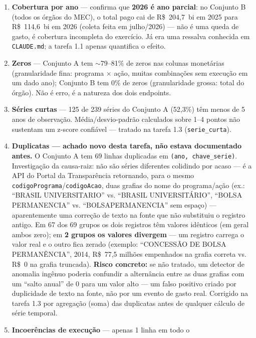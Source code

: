 \documentclass[11pt,a4paper]{article}
\begin{document}
\begin{enumerate}
    \item \textbf{Cobertura por ano} --- confirma que \textbf{2026 é ano
    parcial}: no Conjunto B (todos os órgãos do MEC), o total pago cai de
    R\$~204,7~bi em 2025 para R\$~114,6~bi em 2026 (coleta feita em
    julho/2026) --- não é uma queda de gasto, é cobertura incompleta do
    exercício. Já era uma ressalva conhecida em \texttt{CLAUDE.md}; a
    tarefa 1.1 apenas quantifica o efeito.
    \item \textbf{Zeros} --- Conjunto A tem ${\sim}$79--81\% de zeros nas
    colunas monetárias (granularidade fina: programa $\times$ ação, muitas
    combinações sem execução em um dado ano); Conjunto B tem 0\% de zeros
    (granularidade grossa: total do órgão). Não é erro, é a natureza dos
    dois endpoints.
    \item \textbf{Séries curtas} --- 125 de 239 séries do Conjunto A
    (52,3\%) têm menos de 5 anos de observação. Média/desvio-padrão
    calculados sobre 1--4 pontos não sustentam um z-score confiável ---
    tratado na tarefa 1.3 (\texttt{serie\_curta}).
    \item \textbf{Duplicatas --- achado novo desta tarefa, não estava
    documentado antes.} O Conjunto A tem 69 linhas duplicadas em
    \texttt{(ano, chave\_serie)}. Investigação da causa-raiz: não são
    séries diferentes colidindo por acaso --- é a API do Portal da
    Transparência retornando, para o mesmo
    \texttt{codigoPrograma}/\texttt{codigoAcao}, duas grafias do nome do
    programa/ação (ex.: ``BRASIL UNIVERSITARIO'' vs. ``BRASIL
    UNIVERSITÁRIO'', ``BOLSA PERMANENCIA'' vs. ``BOLSAPERMANENCIA'' sem
    espaço) --- aparentemente uma correção de texto na fonte que não
    substituiu o registro antigo. Em 67 dos 69 grupos os dois registros têm
    valores idênticos (em geral ambos zero); em \textbf{2 grupos os valores
    divergem} --- um registro carrega o valor real e o outro fica zerado
    (exemplo: ``CONCESSÃO DE BOLSA PERMANÊNCIA'', 2014, R\$~77,5 milhões
    empenhados na grafia correta vs. R\$~0 na grafia truncada).
    \textbf{Risco concreto:} se não tratado, um detector de anomalia
    ingênuo poderia confundir a alternância entre as duas grafias com um
    ``salto anual'' de 0 para um valor alto --- um falso positivo criado
    por duplicidade de texto na fonte, não por um evento de gasto real.
    Corrigido na tarefa 1.3 por agregação (soma) das duplicatas antes de
    qualquer cálculo de série temporal.
    \item \textbf{Incoerências de execução} --- apenas 1 linha em todo o

\end{enumerate}
\end{document}
